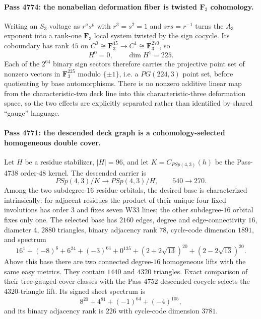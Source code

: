 \paragraph{Pass 4774: the nonabelian deformation fiber is twisted $\mathbf F_3$ cohomology.}
Writing an $S_3$ voltage as $r^a s^p$ with $r^3=s^2=1$ and $srs=r^{-1}$ turns the $A_3$ exponent into a rank-one $\mathbf F_3$ local system twisted by the sign cocycle.  Its coboundary has rank $45$ on
$C^0\cong\mathbf F_3^{45}\to C^1\cong\mathbf F_3^{270}$, so
\[
 H^0=0,\qquad \dim H^1=225.
\]
Each of the $2^{64}$ binary sign sectors therefore carries the projective point set of nonzero vectors in $\mathbf F_3^{225}$ modulo $\{\pm1\}$, i.e. a $PG(224,3)$ point set, before quotienting by base automorphisms.  There is no nonzero additive linear map from the characteristic-two deck line into this characteristic-three deformation space, so the two effects are explicitly separated rather than identified by shared ``gauge'' language.

\paragraph{Pass 4771: the descended deck graph is a cohomology-selected homogeneous double cover.}
Let $H$ be a residue stabilizer, $|H|=96$, and let
$K=C_{PSp(4,3)}(h)$ be the Pass-4738 order-$48$ kernel.  The descended carrier is
\[
 PSp(4,3)/K\longrightarrow PSp(4,3)/H,
 \qquad 540\longrightarrow270.
\]
Among the two subdegree-$16$ residue orbitals, the desired base is characterized intrinsically: for adjacent residues the product of their unique four-fixed involutions has order $3$ and fixes seven W33 lines; the other subdegree-$16$ orbital fixes only one.  The selected base has $2160$ edges, degree and edge-connectivity $16$, diameter $4$, $2880$ triangles, binary adjacency rank $78$, cycle-code dimension $1891$, and spectrum
\[
 16^1+(-8)^6+6^{24}+(-3)^{64}+0^{135}
 +(2+2\sqrt{13})^{20}+(2-2\sqrt{13})^{20}.
\]
Above this base there are two connected degree-$16$ homogeneous lifts with the same easy metrics.  They contain $1440$ and $4320$ triangles.  Exact comparison of their tree-gauged cover classes with the Pass-4752 descended cocycle selects the $4320$-triangle lift.  Its signed sheet spectrum is
\[
 8^{20}+4^{81}+(-1)^{64}+(-4)^{105},
\]
and its binary adjacency rank is $226$ with cycle-code dimension $3781$.

